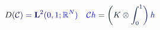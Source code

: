 \documentclass[12pt]{article}
\begin{document}
\makeatletter
\renewcommand*{\@textcolor}[3]{%
  \protect\leavevmode
  \begingroup
    \color#1{#2}#3%
  \endgroup
}
\makeatother
\begin{displaymath}
\begin{array} {rlr} \displaystyle & \displaystyle { { } \mathcolor[RGB]{0,0,15}{D} \mathcolor[RGB]{0,0,30}{(} \mathcal { \mathcolor[RGB]{0,0,45}{C} } \mathcolor[RGB]{0,0,60}{)} \mathcolor[RGB]{0,0,75}{=} \mathbf { \mathcolor[RGB]{0,0,90}{L} } ^ { \mathcolor[RGB]{0,0,105}{2} } \mathcolor[RGB]{0,0,120}{(} \mathcolor[RGB]{0,0,135}{0} \mathcolor[RGB]{0,0,150}{,} \mathcolor[RGB]{0,0,165}{1} \mathcolor[RGB]{0,0,180}{;} \mathbb { \mathcolor[RGB]{0,0,195}{R} } ^ { \mathcolor[RGB]{0,0,210}{N} } \mathcolor[RGB]{0,0,225}{)} } & \displaystyle { \mathcal { \mathcolor[RGB]{0,0,240}{C} } \mathcolor[RGB]{0,0,255}{h} \mathcolor[RGB]{0,15,0}{=} \mathcolor[RGB]{0,15,15}{\left(} \mathcolor[RGB]{0,15,30}{K} \mathcolor[RGB]{0,15,45}{\otimes} \mathcolor[RGB]{0,15,60}{\int} _ { \mathcolor[RGB]{0,15,75}{0} } ^ { \mathcolor[RGB]{0,15,90}{1} } \mathcolor[RGB]{0,15,105}{\right)} \mathcolor[RGB]{0,15,120}{h} } \end{array}
\end{displaymath}
\end{document}

